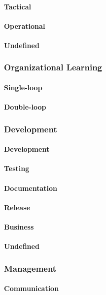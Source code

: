 \paragraph{Tactical}
\paragraph{Operational}
\paragraph{Undefined}
\subsubsection{Organizational Learning}
\paragraph{Single-loop}
\paragraph{Double-loop}
\subsubsection{Development}
\paragraph{Development}
\paragraph{Testing}
\paragraph{Documentation}
\paragraph{Release}
\paragraph{Business}
\paragraph{Undefined}
\subsubsection{Management}
\paragraph{Communication}
